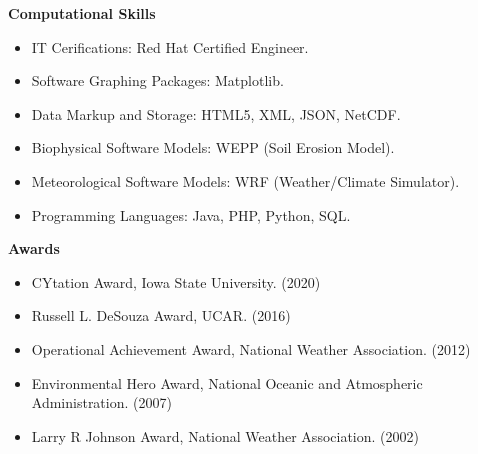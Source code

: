 \documentclass[11pt]{article}
\begin{document}
%
\Large \bf Computational Skills
\normalsize \sf
\begin{itemize}
\item IT Cerifications: Red Hat Certified Engineer.
\item Software Graphing Packages: Matplotlib.
\item Data Markup and Storage: HTML5, XML, JSON, NetCDF.
\item Biophysical Software Models: WEPP (Soil Erosion Model).
\item Meteorological Software Models: WRF (Weather/Climate Simulator).
\item Programming Languages: Java, PHP, Python, SQL.
\end{itemize} 
%
\normalsize \sf
\Large \bf Awards
\normalsize \sf
\begin{itemize}
\item CYtation Award, Iowa State University. (2020)
\item Russell L. DeSouza Award, UCAR. (2016)
\item Operational Achievement Award, National Weather Association. (2012)
\item Environmental Hero Award, National Oceanic and Atmospheric Administration. (2007)
\item Larry R Johnson Award, National Weather Association. (2002)
\end{itemize}
\end{document}
